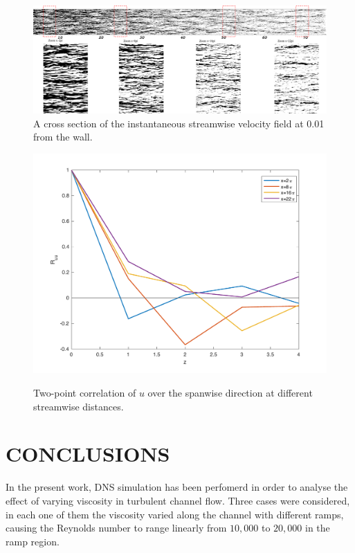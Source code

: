 \documentclass[twocolumn,10pt]{asme2e}
\begin{document}
\begin{figure}[t]
	\includegraphics[width=\textwidth]{streaks.pdf}
	\caption{A cross section of the instantaneous streamwise velocity field at 0.01 from the wall.}
	\label{fig:streaks}
\end{figure}

\begin{figure}[t]
\centering
\scalebox{0.5}
{\includegraphics{spanwise_correlation.pdf}}
\caption{Two-point correlation of \(u\) over the spanwise direction at different streamwise distances.}
\label{fig:spanwise_correlation}
\end{figure}

\section*{CONCLUSIONS}

In the present work, DNS simulation has been perfomerd in order to analyse the effect of varying viscosity in turbulent channel flow. Three cases were considered, in each one of them the viscosity varied along the channel with different ramps, causing the Reynolds number to range linearly from \(10,000\) to \(20,000\) in the ramp region.
\end{document}
